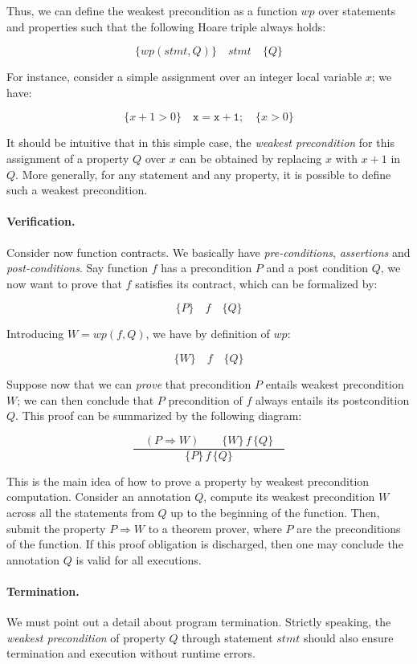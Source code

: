 Thus, we can define the weakest precondition as a function $\mathit{wp}$ over
statements and properties such that the following Hoare triple always holds:

$$ \{\mathit{wp}(stmt,Q)\}\quad \mathit{stmt} \quad \{Q\} $$

For instance, consider a simple assignment over an integer local
variable $x$; we have:

$$ \{ x+1 > 0 \} \quad \mathtt{x = x+1;} \quad \{ x > 0 \} $$

It should be intuitive that in this simple case, the \emph{weakest
  precondition} for this assignment of a property $Q$ over $x$ can be
obtained by replacing $x$ with $x+1$ in $Q$.  More generally, for any
statement and any property, it is possible to define such a weakest
precondition.

\paragraph{Verification.}
Consider now function contracts. We basically have
\emph{pre-conditions}, \emph{assertions} and
\emph{post-conditions}. Say function $f$ has a precondition $P$ and a
post condition $Q$, we now want to prove that $f$ satisfies its
contract, which can be formalized by:

$$ \{P\}\quad f \quad \{Q\} $$

Introducing $W = \mathit{wp}(f,Q)$, we have by definition of $\mathit{wp}$:

$$ \{W\}\quad f \quad \{Q\} $$

Suppose now that we can \emph{prove} that precondition $P$ entails
weakest precondition $W$; we can then conclude that $P$ precondition
of $f$ always entails its postcondition $Q$. This proof can be summarized by
the following diagram:

$$
\frac%
{\quad(P \Longrightarrow W) \quad\quad \{W\}\,f\,\{Q\} \quad}%
{\{P\}\,f\,\{Q\}}
$$

This is the main idea of how to prove a property by weakest
precondition computation. Consider an annotation $Q$, compute its weakest
precondition $W$ across all the statements from $Q$ up to the
beginning of the function. Then, submit the property $P \Longrightarrow
W$ to a theorem prover, where $P$ are the preconditions of the
function. If this proof obligation is discharged, then one may conclude
the annotation $Q$ is valid for all executions.

\paragraph{Termination.}
We must point out a detail about program termination. Strictly
speaking, the \emph{weakest precondition} of property $Q$ through
statement $\mathit{stmt}$ should also ensure termination and execution without
runtime errors.

